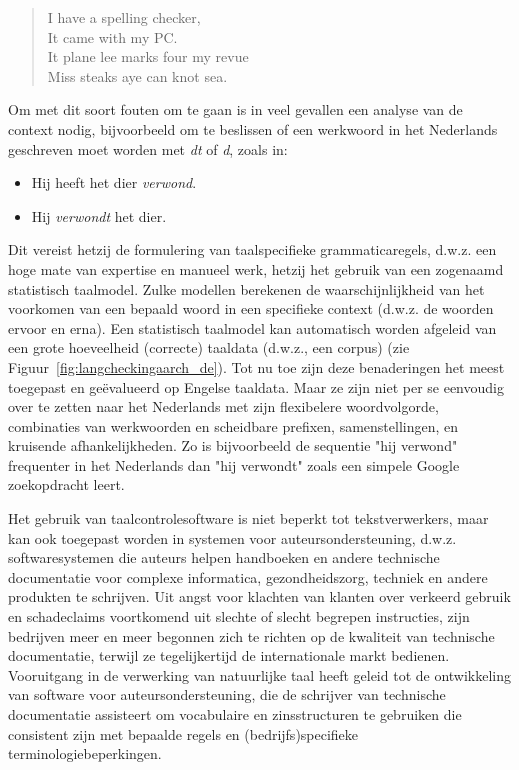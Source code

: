 \begin{multicols}{2}
\begin{quote}
  I have a spelling checker,\\
  It came with my PC.\\
  It plane lee marks four my revue\\
  Miss steaks aye can knot sea.
\end{quote}



    Om met dit soort fouten om te gaan is in veel gevallen een analyse van de context nodig, bijvoorbeeld om te beslissen of een werkwoord in het Nederlands geschreven moet worden met \emph{dt} of \emph{d}, zoals in:

\begin{itemize}
 \item   Hij heeft het dier \textit{verwond}.
 \item   Hij \textit{verwondt} het dier.
\end{itemize}



    Dit vereist hetzij de formulering van taalspecifieke grammaticaregels, d.w.z. een hoge mate van expertise en manueel werk, hetzij het gebruik van een zogenaamd statistisch taalmodel. Zulke modellen berekenen de waarschijnlijkheid van het voorkomen van een bepaald woord in een specifieke context (d.w.z. de woorden ervoor en erna). Een statistisch taalmodel kan automatisch worden afgeleid van een grote hoeveelheid (correcte) taaldata (d.w.z., een corpus) (zie Figuur~\ref{fig:langcheckingaarch_de}). Tot nu toe zijn deze benaderingen het meest toegepast en ge{\"e}va\-lueerd op Engelse taaldata. Maar ze zijn niet per se eenvoudig over te zetten naar het Nederlands met zijn flexibelere woordvolgorde, combinaties van werkwoorden en scheidbare prefixen, samenstellingen, en kruisende afhankelijkheden. Zo is bijvoorbeeld de sequentie "hij verwond" frequenter in het Nederlands dan "hij verwondt" zoals een simpele Google zoekopdracht leert.


    Het gebruik van taalcontrolesoftware is niet beperkt tot tekstverwerkers, maar kan ook toegepast worden in systemen voor auteursondersteuning, d.w.z. softwaresystemen die auteurs helpen handboeken en andere technische documentatie voor complexe informatica, gezondheidszorg, techniek en andere produkten te schrijven.  Uit angst voor klachten van klanten over verkeerd gebruik en schadeclaims voortkomend uit slechte of slecht begrepen instructies, zijn bedrijven meer en meer begonnen zich te richten op de kwaliteit van technische documentatie, terwijl ze tegelijkertijd de internationale markt bedienen. Vooruitgang in de verwerking van natuurlijke taal heeft geleid tot de ontwikkeling van software voor auteursondersteuning, die de schrijver van technische documentatie assisteert om vocabulaire en zinsstructuren te gebruiken die consistent zijn met bepaalde regels en (bedrijfs)specifieke terminologiebeperkingen.




\end{multicols}
